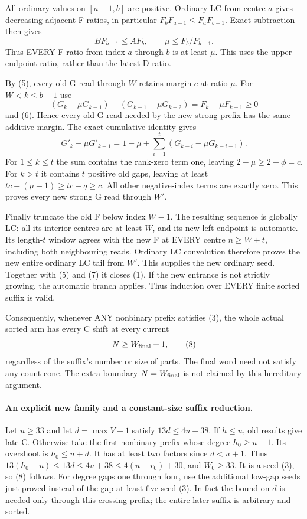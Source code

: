All ordinary values on $[a-1,b]$ are positive. Ordinary LC from
centre $a$ gives decreasing adjacent F ratios, in particular
$F_bF_{a-1}\le F_aF_{b-1}$. Exact subtraction then gives
\[
  B F_{b-1}\le A F_b,\qquad
              \mu\le F_b/F_{b-1}.                  \tag{6}
\]
Thus EVERY F ratio from index $a$ through $b$ is at least $\mu$.
This uses the upper endpoint ratio, rather than the latest D ratio.

By (5), every old G read through $W$ retains margin $c$ at ratio $\mu$.
For $W<k\le b-1$ use
\[
 (G_k-\mu G_{k-1})-(G_{k-1}-\mu G_{k-2})
                         =F_k-\mu F_{k-1}\ge0
\]
and (6). Hence every old G read needed by the new strong prefix
has the same additive margin. The exact cumulative identity gives
\[
 G'_k-\mu G'_{k-1}
       =1-\mu+\sum_{i=1}^t(G_{k-i}-\mu G_{k-i-1}).   \tag{7}
\]
For $1\le k\le t$ the sum contains the rank-zero term one,
leaving $2-\mu\ge2-\phi=c$. For $k>t$ it contains $t$ positive
old gaps, leaving at least $tc-(\mu-1)\ge tc-q\ge c$.
All other negative-index terms are exactly zero.
This proves every new strong G read through $W'$.

Finally truncate the old F below index $W-1$. The resulting sequence
is globally LC: all its interior centres are at least $W$, and its
new left endpoint is automatic. Its length-$t$ window agrees with
the new F at EVERY centre $n\ge W+t$, including both neighbouring
reads. Ordinary LC convolution therefore proves the new entire
ordinary LC tail from $W'$. This supplies the new ordinary seed.
Together with (5) and (7) it closes (1).
If the new entrance is not strictly growing, the automatic branch
applies. Thus induction over EVERY finite sorted suffix is valid.

Consequently, whenever ANY nonbinary prefix satisfies (3), the
whole actual sorted arm has every C shift at every current
\[
                         N\ge W_{\rm final}+1,      \tag{8}
\]
regardless of the suffix's number or size of parts. The final word
need not satisfy any count cone. The extra boundary $N=W_{\rm final}$
is not claimed by this hereditary argument.

\paragraph{An explicit new family and a constant-size suffix reduction.}
Let $u\ge33$ and let $d=\max V-1$ satisfy $13d\le4u+38$.
If $h\le u$, old results give late C. Otherwise take the first
nonbinary prefix whose degree $h_0\ge u+1$. Its overshoot is
$h_0\le u+d$. It has at least two factors since $d<u+1$.
Thus $13(h_0-u)\le13d\le4u+38\le4(u+r_0)+30$,
and $W_0\ge33$. It is a seed (3), so (8) follows.
For degree gaps one through four, use the additional low-gap seeds
just proved instead of the gap-at-least-five seed (3).
In fact the bound on $d$ is needed only through this crossing
prefix; the entire later suffix is arbitrary and sorted.

